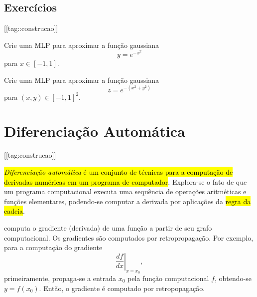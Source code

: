 \subsection{Exercícios}

[[tag::construcao]]

\begin{exer}
  Crie uma MLP para aproximar a função gaussiana
  \begin{equation}
    y = e^{-x^2}
  \end{equation}
  para $x\in [-1, 1]$.
\end{exer}

\begin{exer}
  Crie uma MLP para aproximar a função gaussiana
  \begin{equation}
    z = e^{-(x^2 + y^2)}
  \end{equation}
  para $(x, y) \in [-1, 1]^2$.
\end{exer}

\section{Diferenciação Automática}\label{cap_mlp_sec_autograd}

[[tag:construcao]]

\hl{\emph{Diferenciação automática} é um conjunto de técnicas para a computação de derivadas numéricas em um programa de computador}. Explora-se o fato de que um programa computacional executa uma sequência de operações aritméticas e funções elementares, podendo-se computar a derivada por aplicações da \hl{regra da cadeia}.

{\pytorch} computa o gradiente (derivada) de uma função a partir de seu grafo computacional. Os gradientes são computados por retropropagação. Por exemplo, para a computação do gradiente
\begin{equation}
  \left.\frac{d f}{d x}\right|_{x = x_0},
\end{equation}
primeiramente, propaga-se a entrada $x_0$ pela função computacional $f$, obtendo-se $y = f(x_0)$. Então, o gradiente é computado por retropopagação.

